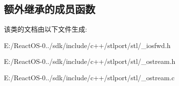 \subsection*{额外继承的成员函数}


该类的文档由以下文件生成\+:\begin{DoxyCompactItemize}
\item 
E\+:/\+React\+O\+S-\/0../sdk/include/c++/stlport/stl/\+\_\+iosfwd.\+h\item 
E\+:/\+React\+O\+S-\/0../sdk/include/c++/stlport/stl/\+\_\+ostream.\+h\item 
E\+:/\+React\+O\+S-\/0../sdk/include/c++/stlport/stl/\+\_\+ostream.\+c\end{DoxyCompactItemize}
